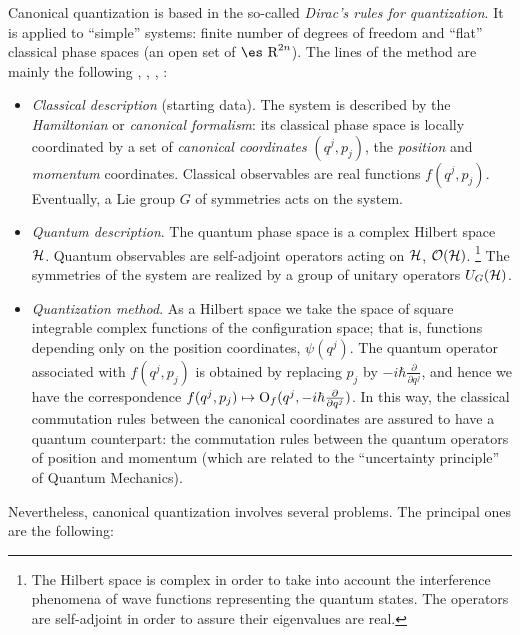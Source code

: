 \documentclass[12pt]{article}
\def\derpar#1#2{\frac{\partial{#1}}{\partial{#2}}}
\def\H{{\cal H}}
\def\Op{{\rm O}}
\def\Real{\mbox{\es R}}
\begin{document}
Canonical quantization is based in the so-called {\it Dirac's rules for
quantization}.
It is applied to ``simple'' systems:
finite number of degrees of freedom and
``flat'' classical phase spaces (an open set of $\Real^{2n}$).
The lines of the method are mainly the following
\cite{AM-78}, \cite{CDL-77}, \cite{Di-pqm}, \cite{GP-78}:
\begin{itemize}
\item
{\it Classical description} (starting data).
The system is described by the {\it Hamiltonian} or {\it canonical
formalism}:
its classical phase space is locally coordinated
by a set of {\it canonical coordinates} $(q^j,p_j)$,
the {\it position} and {\it momentum} coordinates.
Classical observables are real functions $f(q^j,p_j)$.
Eventually, a Lie group $G$ of symmetries acts on the system.
\item
{\it Quantum description}.
The quantum phase space is a complex Hilbert space $\H$.
Quantum observables are self-adjoint operators acting on $\H$, ${\cal
O}(\H )$.%
\footnote{
The Hilbert space is complex in order to take into account the
interference phenomena of wave functions representing the quantum
states.
The operators are self-adjoint in order to assure their eigenvalues are
real.}
The symmetries of the system are realized by a group of unitary
operators $U_G(\H )$.
\item
{\it Quantization method}.
As a Hilbert space we take the space of square integrable complex
functions
of the configuration space; that is, functions depending only on the
position coordinates,
$\psi(q^j)$. The quantum operator associated with $f(q^j,p_j)$
is obtained by replacing $p_j$ by $-i\hbar \derpar{}{q^j}$,
and hence we have the correspondence
$f(q^j,p_j) \mapsto \Op_f(q^j,-i\hbar \derpar{}{q^j})$.
In this way, the classical commutation rules
between the canonical coordinates are assured to have
a quantum counterpart: the commutation rules
between the quantum operators of position and momentum
(which are related to the ``uncertainty principle'' of Quantum
Mechanics).
\end{itemize}
Nevertheless, canonical quantization involves several problems.
The principal ones are the following:
\end{document}

